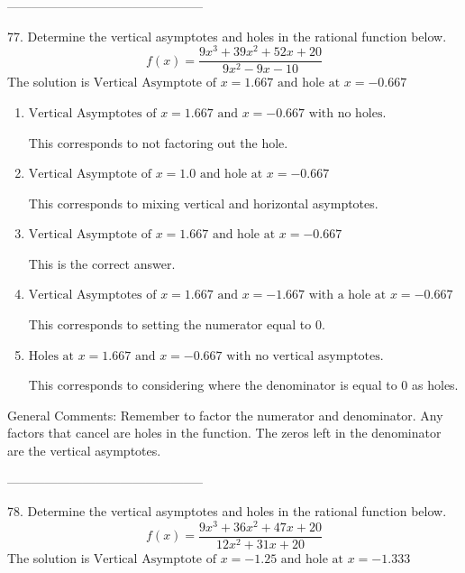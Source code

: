\documentclass{extbook}[14pt]
\begin{document}
-----------------------------------------------

77. Determine the vertical asymptotes and holes in the rational function below.
\[ f(x) = \frac{9x^{3} +39 x^{2} +52 x + 20}{9x^{2} -9 x -10} \] 
The solution is $ \text{Vertical Asymptote of } x = 1.667 \text{ and hole at } x = -0.667 $ 

\begin{enumerate}[label=\Alph*.] 
\item $ \text{Vertical Asymptotes of } x = 1.667 \text{ and } x = -0.667 \text{ with no holes.} $ 

 This corresponds to not factoring out the hole. 
\item $ \text{Vertical Asymptote of } x = 1.0 \text{ and hole at } x = -0.667 $ 

 This corresponds to mixing vertical and horizontal asymptotes. 
\item $ \text{Vertical Asymptote of } x = 1.667 \text{ and hole at } x = -0.667 $ 

 This is the correct answer. 
\item $ \text{Vertical Asymptotes of } x = 1.667 \text{ and } x = -1.667 \text{ with a hole at } x = -0.667 $ 

 This corresponds to setting the numerator equal to 0. 
\item $ \text{Holes at } x = 1.667 \text{ and } x = -0.667 \text{ with no vertical asymptotes.} $ 

 This corresponds to considering where the denominator is equal to 0 as holes. 
\end{enumerate} 
 
General Comments: Remember to factor the numerator and denominator. Any factors that cancel are holes in the function. The zeros left in the denominator are the vertical asymptotes.

-----------------------------------------------

78. Determine the vertical asymptotes and holes in the rational function below.
\[ f(x) = \frac{9x^{3} +36 x^{2} +47 x + 20}{12x^{2} +31 x + 20} \] 
The solution is $ \text{Vertical Asymptote of } x = -1.25 \text{ and hole at } x = -1.333 $ 
\end{document}
